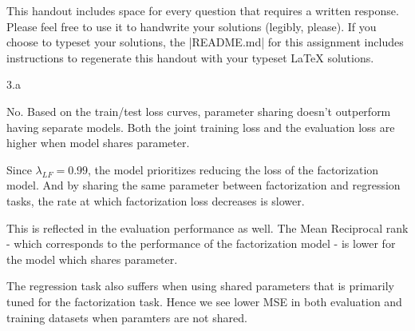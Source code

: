 

\def\assignmentnum{1 }
\def\assignmenttitle{XCS330 Problem Set \assignmentnum}


\pagestyle{myheadings} \markboth{}{\assignmenttitle}


This handout includes space for every question that requires a written response.
Please feel free to use it to handwrite your solutions (legibly, please).  If
you choose to typeset your solutions, the |README.md| for this assignment includes
instructions to regenerate this handout with your typeset \LaTeX{} solutions.

\LARGE
3.a
\normalsize
\begin{answer}
No. Based on the train/test loss curves, parameter sharing doesn't outperform having separate models. Both the joint training loss and the evaluation loss are higher when model shares parameter. 

Since $\lambda_{LF} = 0.99$, the model prioritizes reducing the loss of the factorization model. And by sharing the same parameter between factorization and regression tasks, the rate at which factorization loss decreases is slower. 

This is reflected in the evaluation performance as well. The Mean Reciprocal rank - which corresponds to the performance of the factorization model - is lower for the model which shares parameter. 

The regression task also suffers when using shared parameters that is primarily tuned for the factorization task. Hence we see lower MSE in both evaluation and training datasets when paramters are not shared. 
\end{answer}

